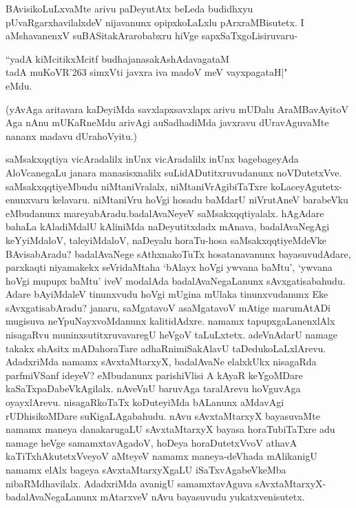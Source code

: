BAvisi\-koLuLxvaMte arivu paDe\-yutAtx beLeda budidhxyu pUvaRgarxhavilalxdeV nijavanunx opipxkoLaLxlu pArxraMBisutetx. I aMshavanenxV suBASitakArarobabxru hiVge sapxSaTxgoLisiruvaru-

\medskip
 
 \begin{shloka}
 ``yadA kiMcitikxMcitf budhajanasakAshAdavagataM \\
 tadA muKoVR\char'263 simxVti javxra iva madoV meV vayxpagataH|"\\
 eMdu.
 \end{shloka}

\newpage

 \noindent
(yAvAga aritavara kaDeyiMda savxlapxsavxlapx arivu mUDalu AraMBavAyitoV Aga nAnu mUKaR\-neMdu arivAgi auSadhadiMda javxravu dUravAguvaMte nananx madavu dUrahoVyitu.)

saMsakxqqtiya vicAradalilx inUnx vicAradalilx inUnx bagebageyAda AloVcane\-gaLu janara manasisx\-nalilx suLidADutitxruvudanunx noVDutetxVve. saMsakxqqti\-yeMbudu niMtaniVralalx, niMtaniVrAgibiTaTxre koLace\-yAgutetx-\-enunxvaru kelavaru. niMta\-niVru hoVgi hosadu baMdarU niVrutAneV barabeVku eMbu\-danunx mareyabAradu.\break badalAvaNeyeV saMsakxqqtiyalalx. hAgAdare bahaLa kAla\-diMdalU kAliniMda naDe\-yutitxdadx mAnava, badalAvaNegAgi keYyiMdaloV, taleyiMdaloV, naDeyalu horaTu-hosa saMsakxqqtiyeMdeVke BAvisabAradu? badalAvaNege sAthxnakoTuTx hosatanavanunx bayasuvudAdare, parxkaqti niyamakekx seVridaMtaha `bAlayx hoVgi ywvana baMtu', `ywvana hoVgi mupupx baMtu' iveV moda\-lAda badalA\-vaNe\-gaLanunx sAvxgatisabahudu. Adare bAyiMdaleV tinunxvudu hoVgi mUgina\- mUlaka\- tinunx\-vudanunx Eke sAvxgatisabAradu? janaru, saMgatavoV asaMgatavoV mAtige marumAtADi mugisuva neYpuNayxvoMdanunx kalitidAdxre. namamx tapupxgaLanenxlAlx nisagaRvu muninxsutitxruvavaregU heVgoV taLuLxtetx. adeVnAdarU namage takakx shAsitx mADahoraTare adhaRnimiSakAlavU taDedukoLaLxlArevu. AdadxriMda namamx sAvxtaMtarxyX, badalAvaNe elalxkUkx nisagaRda parfmiVSanf ideyeV? eMbu\-danunx pari\-shiVlisi A kAyaR\- keYgoMDare kaSaTxpaDabeVkAgilalx. nAveVnU baruvAga taralArevu hoVguvAga oyayxlArevu. nisagaRkoTaTx koDuteyiMda bALanunx aMdavAgi rUDhisikoMDare suKigaLAgabahudu. nAvu sAvxtaMtarxyX bayasuvaMte namamx maneya danakarugaLU sAvxtaMtarxyX bayasa horaTubiTaTxre adu namage heVge samamxta\-vAgadoV, hoDeya horaDutetxVvoV athavA kaTiTxhAkutetxVveyoV aMteyeV namamx maneya-deVhada mAlikanigU namamx elAlx bageya sAvxtaMtarxyXgaLU iSaTxvAgabeVkeMba \-nibaRMdhavilalx. AdadxriMda avanigU samamxtavAguva sAvxtaMtarxyX-badalAvaNegaLanunx mAtarxveV nAvu bayasuvudu yukatxvenisutetx.

